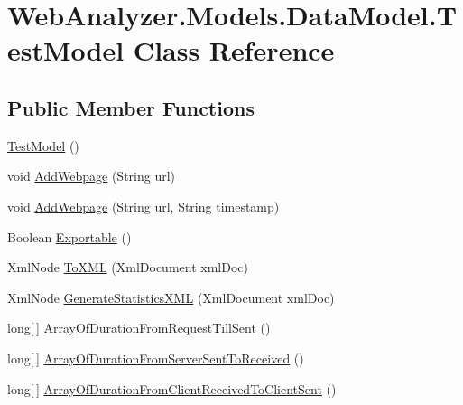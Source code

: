 \hypertarget{class_web_analyzer_1_1_models_1_1_data_model_1_1_test_model}{}\section{Web\+Analyzer.\+Models.\+Data\+Model.\+Test\+Model Class Reference}
\label{class_web_analyzer_1_1_models_1_1_data_model_1_1_test_model}
\subsection*{Public Member Functions}
\begin{DoxyCompactItemize}
\item 
\hyperlink{class_web_analyzer_1_1_models_1_1_data_model_1_1_test_model_a237f4021726f632e9eb468585d959ad3}{Test\+Model} ()
\item 
void \hyperlink{class_web_analyzer_1_1_models_1_1_data_model_1_1_test_model_a947bc920ec736799df566da1f5660c70}{Add\+Webpage} (String url)
\item 
void \hyperlink{class_web_analyzer_1_1_models_1_1_data_model_1_1_test_model_a71db82cab933dd7e7585915bd97740dd}{Add\+Webpage} (String url, String timestamp)
\item 
Boolean \hyperlink{class_web_analyzer_1_1_models_1_1_data_model_1_1_test_model_af8e1e55844cdb5e707ed4a0942448867}{Exportable} ()
\item 
Xml\+Node \hyperlink{class_web_analyzer_1_1_models_1_1_data_model_1_1_test_model_af8f96e7cfa71b5bb99c4bfbaa469368d}{To\+X\+M\+L} (Xml\+Document xml\+Doc)
\item 
Xml\+Node \hyperlink{class_web_analyzer_1_1_models_1_1_data_model_1_1_test_model_a81c7aa756c48c0a577b9877ebbbb07b8}{Generate\+Statistics\+X\+M\+L} (Xml\+Document xml\+Doc)
\item 
long\mbox{[}$\,$\mbox{]} \hyperlink{class_web_analyzer_1_1_models_1_1_data_model_1_1_test_model_ad9e6b0da3998485b11af3f532c429136}{Array\+Of\+Duration\+From\+Request\+Till\+Sent} ()
\item 
long\mbox{[}$\,$\mbox{]} \hyperlink{class_web_analyzer_1_1_models_1_1_data_model_1_1_test_model_a6e300cf8b7c50571b1f99230d322fb78}{Array\+Of\+Duration\+From\+Server\+Sent\+To\+Received} ()
\item 
long\mbox{[}$\,$\mbox{]} \hyperlink{class_web_analyzer_1_1_models_1_1_data_model_1_1_test_model_a2f272e9970feb3a1fbca147b34b8b3f7}{Array\+Of\+Duration\+From\+Client\+Received\+To\+Client\+Sent} ()

\end{DoxyCompactItemize}
